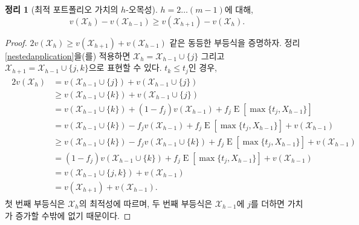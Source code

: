 \documentclass[11pt]{article} %
\newif\ifen
\newtheorem{theorem}{Theorem}
\theoremstyle{definition}
\newtheorem{theorem}{정리}
\theoremstyle{definition}
\begin{document}
\begin{theorem}[\ifen Optimal portfolio valuation concave in $h$\else 최적 포트폴리오 가치의 $h$-오목성\fi] \label{concavityinh}
\ifen For $h = 2 \dots (m-1)$,
\else $h = 2 \dots (m-1)$에 대해,\fi
\begin{equation}v(\mathcal{X}_h) - v(\mathcal{X}_{h-1}) \geq v(\mathcal{X}_{h+1}) - v(\mathcal{X}_{h}).\end{equation} 
\end{theorem}
\begin{proof}
\ifen We will prove the equivalent expression $2 v(\mathcal{X}_h) \geq v(\mathcal{X}_{h+1}) + v(\mathcal{X}_{h-1})$. Applying Theorem \ref{nestedapplication}, we write $\mathcal{X}_h = \mathcal{X}_{h-1} \cup\{j\}$ and $\mathcal{X}_{h+1} = \mathcal{X}_{h-1} \cup\{j, k\}$. If $t_k \leq t_j$, then 
\else $2 v(\mathcal{X}_h) \geq v(\mathcal{X}_{h+1}) + v(\mathcal{X}_{h-1})$ 같은 동등한 부등식을 증명하자. 정리 \ref{nestedapplication}을(를) 적용하면 $ \mathcal{X}_h = \mathcal{X}_{h-1} \cup\{j\}$ 그리고 $\mathcal{X}_{h+1} = \mathcal{X}_{h-1} \cup\{j, k\}$으로 표현할 수 있다. $t_k \leq t_j$인 경우, \fi
\begin{align}
\begin{split}
2 v(\mathcal{X}_h) &= v(\mathcal{X}_{h-1} \cup\{j\}) + v(\mathcal{X}_{h-1} \cup\{j\}) \\
&\geq v(\mathcal{X}_{h-1} \cup\{k\}) + v(\mathcal{X}_{h-1} \cup\{j\}) \\
&= v(\mathcal{X}_{h-1} \cup\{k\}) + (1 - f_j) v(\mathcal{X}_{h-1}) + f_j \operatorname{E}[\max\{t_j, X_{h-1}\}] \\
&= v(\mathcal{X}_{h-1} \cup\{k\}) - f_j v(\mathcal{X}_{h-1}) + f_j \operatorname{E}[\max\{t_j, X_{h-1}\}] + v(\mathcal{X}_{h-1})  \\
&\geq v(\mathcal{X}_{h-1} \cup\{k\})  - f_j v(\mathcal{X}_{h-1}\cup\{k\}) + f_j \operatorname{E}[\max\{t_j, X_{h-1}\}]+ v(\mathcal{X}_{h-1})\\
&= (1 - f_j) v(\mathcal{X}_{h-1} \cup\{k\})  + f_j \operatorname{E}[\max\{t_j, X_{h-1}\}]+ v(\mathcal{X}_{h-1})\\
&=  v(\mathcal{X}_{h-1} \cup\{j, k\}) + v(\mathcal{X}_{h-1})\\
&=  v(\mathcal{X}_{h+1}) + v(\mathcal{X}_{h-1}).
\end{split} 
\end{align}
\ifen The first inequality follows from the optimality of $\mathcal{X}_h$, while the second follows from the fact that adding $k$ to $\mathcal{X}_{h-1}$ can only increase its valuation.
\else 첫 번째 부등식은 $\mathcal{X}_h$의 최적성에 따르며, 두 번째 부등식은 $\mathcal{X}_{h-1}$에 $j$를 더하면 가치가 증가할 수밖에 없기 때문이다.\fi


\end{proof}
\end{document}
